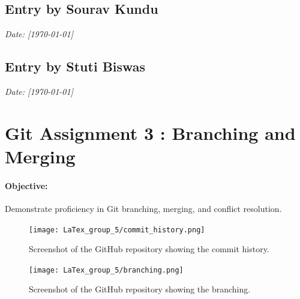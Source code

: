 \documentclass[12pt, a4paper]{article}
\begin{document}
\subsection*{Entry by Sourav Kundu}
\textit{Date: [\today]}\\

\newpage
{}
\vspace{-2cm}
\subsection*{Entry by Stuti Biswas}
\textit{Date: [\today]}\\
\section*{\Huge{Git Assignment 3 : Branching and Merging}}

\paragraph{Objective:} Demonstrate proficiency in Git branching, merging, and conflict resolution.

\vspace{0.5cm}

\begin{figure}[h!]
    \centering
    \texttt{[image: LaTex\_group\_5/commit\_history.png]} %
     \hspace{4 cm}
    \caption{Screenshot of the GitHub repository showing the commit history.}
\end{figure}

\begin{figure}[h!]
    \centering
    \texttt{[image: LaTex\_group\_5/branching.png]} %
     \hspace{4 cm}
    \caption{Screenshot of the GitHub repository showing the branching.}
\end{figure}
\newpage
{}
\vspace{-1.5cm}
\end{document}
